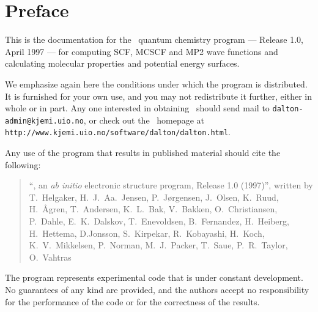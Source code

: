 \tableofcontents

\chapter*{Preface}

          This is the documentation for the \siraba\ 
quantum chemistry program --- Release 1.0, April 1997 --- for computing SCF,
MCSCF and MP2 wave functions and calculating 
molecular properties and potential energy surfaces.

          We emphasize again here the conditions under which the
program is distributed.  It is furnished for your own use,
and you may not redistribute it further, either in whole or in
part.  Any one interested in obtaining \siraba\ should send mail to
\verb|dalton-admin@kjemi.uio.no|, or check out the \siraba\ homepage
at \newline
\verb|http://www.kjemi.uio.no/software/dalton/dalton.html|.

          Any use of the program that results in published
material should cite the following:
\begin{quote}
``\siraba , an {\em ab initio} electronic  structure program, Release
1.0 (1997)'', written by 
T.~Helgaker, H.~J.~Aa.~Jensen, P.~J{\o}rgensen, J.~Olsen, K.~Ruud, H.~\AA gren,
T.~Andersen, K.~L.~Bak, V.~Bakken, O.~Christiansen, 
P.~Dahle, E.~K.~Dalskov, T.~Enevoldsen, B.~Fernandez, H.~Heiberg,
H.~Hettema, D.Jonsson, S.~Kirpekar, R.~Kobayashi, H.~Koch,
K.~V.~Mikkelsen, P.~Norman, M.~J.~Packer, T.~Saue, 
P.~R.~Taylor, O.~Vahtras 
\end{quote}

          The program represents experimental code that is
under constant development.  No guarantees of any kind are
provided, and the authors accept no responsibility for the
performance of the code or for the correctness of the results.
